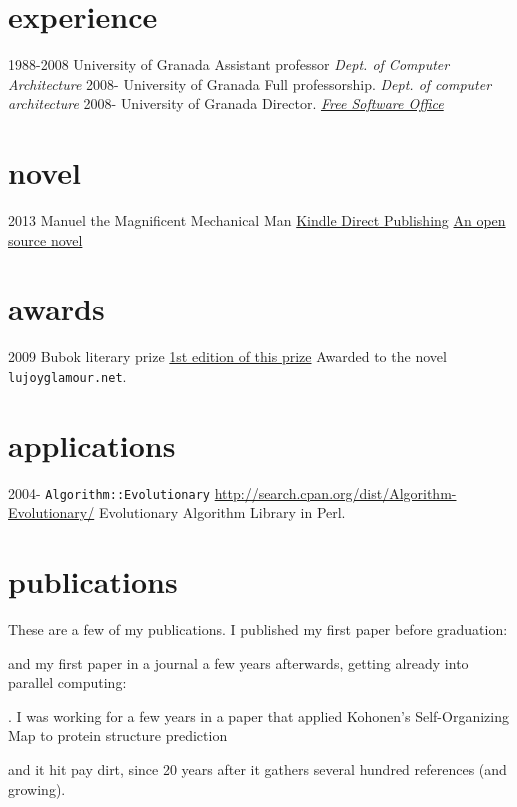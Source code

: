 \documentclass[]{friggeri-jj-cv}
\begin{document}
\section{experience}

\begin{entrylist}
  \entry
    {1988-2008}
    {University of Granada}
    {Assistant professor}
    {\emph{Dept. of Computer Architecture}}
  \entry
    {2008-}
    {University of Granada}
    {Full professorship.}
    {\emph{Dept. of computer architecture}}
    \entry
    {2008-}
    {University of Granada}
    {Director.}
    {\href{http://osl.ugr.es}{\emph{Free Software Office}}}
\end{entrylist}

\section{novel}
\begin{entrylist}
  \entry
    {2013}
    {Manuel the Magnificent Mechanical Man}
    {\href{http://www.amazon.com/dp/B00ED084BK/}{Kindle Direct Publishing}}
    {\href{http://jj.github.io/hoborg}{An open source novel}}
\end{entrylist}

\section{awards}
\begin{entrylist}
 \entry
    {2009}
    {Bubok literary prize}
    {\href{http://cultura.elpais.com/cultura/2009/05/06/actualidad/1241560804_850215.html}{1st
        edition of this prize}}
    {Awarded to the novel {\tt lujoyglamour.net}.}
\end{entrylist}


\section{applications}

\begin{entrylist}
  \entry
    {2004-}
    {{\tt Algorithm::Evolutionary}}
    {\href{http://search.cpan.org/dist/Algorithm-Evolutionary/}{http://search.cpan.org/dist/Algorithm-Evolutionary/}}
    {Evolutionary Algorithm Library in Perl.}

\end{entrylist}

\section{publications}

These are a few of my publications. I published my first paper before
graduation: 

\cite{merelo88} 
and my first paper in a journal a few years
afterwards, getting already into parallel computing:

\cite{parallel90}. 
I was working for a few years in a paper that
applied Kohonen's Self-Organizing Map to protein structure prediction

\cite{jjproteng} 
and it hit pay dirt, since 20 years after it gathers
several hundred references (and growing).

\end{document}

